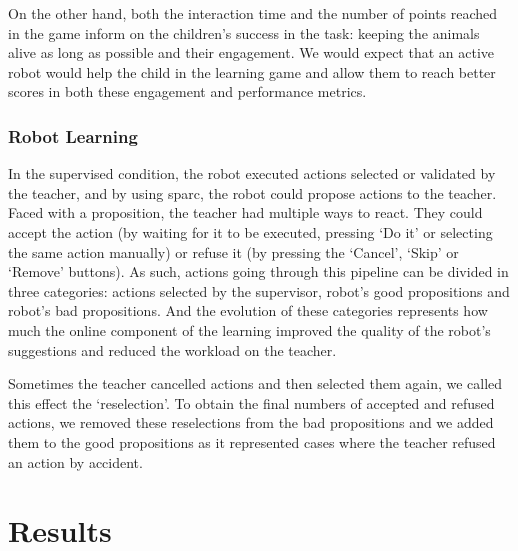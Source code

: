 On the other hand, both the interaction time and the number of points reached in the game inform on the children's success in the task: keeping the animals alive as long as possible and their engagement. We would expect that an active robot would help the child in the learning game and allow them to reach better scores in both these engagement and performance metrics.


\subsubsection{Robot Learning}

In the supervised condition, the robot executed actions selected or validated by the teacher, and by using \gls{sparc}, the robot could propose actions to the teacher. Faced with a proposition, the teacher had multiple ways to react. They could accept the action (by waiting for it to be executed, pressing `Do it' or selecting the same action manually) or refuse it (by pressing the `Cancel', `Skip' or `Remove' buttons). As such, actions going through this pipeline can be divided in three categories: actions selected by the supervisor, robot's good propositions and robot's bad propositions. And the evolution of these categories represents how much the online component of the learning improved the quality of the robot's suggestions and reduced the workload on the teacher. 

Sometimes the teacher cancelled actions and then selected them again, we called this effect the `reselection'. To obtain the final numbers of accepted and refused actions, we removed these reselections from the bad propositions and we added them to the good propositions as it represented cases where the teacher refused an action by accident.

\section{Results}



